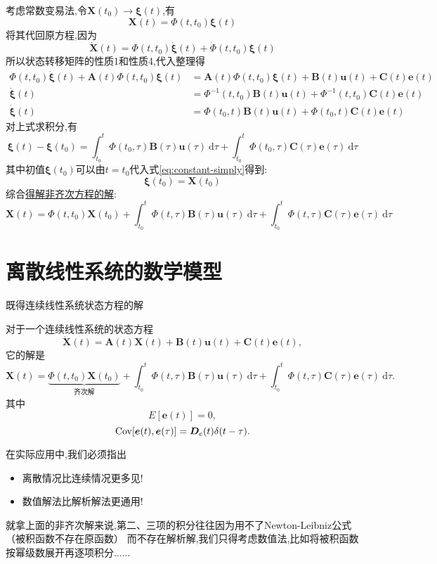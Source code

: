 \documentclass[cn,10pt,citestyle=gb7714-2015,bibstyle=gb7714-2015]{elegantbook}
\newcommand{\md}{\ \mathrm{d}}
\newcommand{\Cov}{\textup{Cov}}
\begin{document}
考虑\colorbox{yellow!20}{常数变易法},令$\bm{X}(t_0)\to \bm{\xi}(t)$,有
\begin{equation}\label{eq:constant-simply}
  \bm{X}(t)=\bm{\varPhi}(t,t_0)\bm{\xi}(t)
\end{equation}
将其代回原方程,因为
\begin{equation}
  \dot{\bm{X}}(t)=\bm{\varPhi}(t,t_0)\dot{\bm{\xi}}(t)+\dot{\bm{\varPhi}}(t,t_0)\bm{\xi}(t)
\end{equation}
所以状态转移矩阵的性质1和性质4,代入整理得
\begin{align*}
  \bm{\varPhi}(t,t_0)\dot{\bm{\xi}}(t)+\bm{A}(t)\bm{\varPhi}(t,t_0)\bm{\xi}(t)&=\bm{A}(t)\bm{\varPhi}(t,t_0)\bm{\xi}(t)+\bm{B}(t)\bm{u}(t)+\bm{C}(t)\bm{e}(t)\\
  \dot{\bm{\xi}}(t)&=\bm{\varPhi}^{-1}(t,t_0)\bm{B}(t)\bm{u}(t)+\bm{\varPhi}^{-1}(t,t_0)\bm{C}(t)\bm{e}(t)\\
  \dot{\bm{\xi}}(t)&=\bm{\varPhi}(t_0,t)\bm{B}(t)\bm{u}(t)+\bm{\varPhi}(t_0,t)\bm{C}(t)\bm{e}(t)
\end{align*}
对上式求积分,有
\begin{equation}
  \bm{\xi}(t)-\bm{\xi}(t_0)=\int_{t_0}^t\bm{\varPhi}(t_0,\tau)\bm{B}(\tau)\bm{u}(\tau)\md\tau+\int_{t_0}^t\bm{\varPhi}(t_0,\tau)\bm{C}(\tau)\bm{e}(\tau)\md\tau
\end{equation}
其中初值$\bm{\xi}(t_0)$可以由$t=t_0$代入式\eqref{eq:constant-simply}得到:
\begin{equation}
  \bm{\xi}(t_0)=\bm{X}(t_0)
\end{equation}
综合\uline{得解非齐次方程的解}:
\begin{equation}
  \boxed{
  \bm{X}(t)=\bm{\varPhi}(t,t_0)\bm{X}(t_0)+\int_{t_0}^t\bm{\varPhi}(t,\tau)\bm{B}(\tau)\bm{u}(\tau)\md\tau+\int_{t_0}^t\bm{\varPhi}(t,\tau)\bm{C}(\tau)\bm{e}(\tau)\md\tau
  }
\end{equation}
\section{离散线性系统的数学模型}
既得连续线性系统状态方程的解
\begin{theorem}[连续线性系统状态方程的解]\label{thm:continuous-linear-system-solution}
  对于一个连续线性系统的状态方程
  \[
      \dot{\bm{X}}(t)=\bm{A}(t)\bm{X}(t)+\bm{B}(t)\bm{u}(t)+\bm{C}(t)\bm{e}(t),
  \]
  它的解是
  \[
      \bm{X}(t)=\underbrace{\bm{\varPhi}(t,t_0)\bm{X}(t_0)}_{\text{齐次解}}+\int_{t_0}^t\bm{\varPhi}(t,\tau)\bm{B}(\tau)\bm{u}(\tau)\md\tau+\int_{t_0}^t\bm{\varPhi}(t,\tau)\bm{C}(\tau)\bm{e}(\tau)\md\tau.
  \]
  其中
  \[
    E[\bm{e}(t)]=0,
  \]  
  \[
      \Cov[\bm{e}(t),\bm{e}(\tau)]=\bm{D}_e(t)\delta(t-\tau).
  \]
\end{theorem}
在实际应用中,我们必须指出
\begin{note}
  \begin{itemize}
    \item 离散情况比连续情况更多见!
    \item 数值解法比解析解法更通用!
  \end{itemize}
\end{note}
就拿上面的非齐次解来说,第二、三项的积分往往因为用不了Newton-Leibniz公式（被积函数不存在原函数）
而不存在解析解,我们只得考虑数值法,比如将被积函数按幂级数展开再逐项积分......
\end{document}

